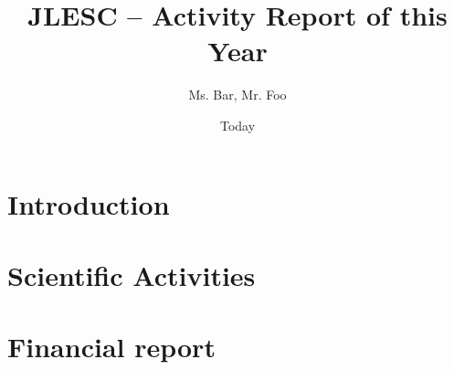 \documentclass[12pt]{article}
\title{JLESC -- Activity Report of this Year}
\author{Ms. Bar, Mr. Foo}
\date{Today}
\theoremstyle{definition}
\begin{document}
\maketitle
\thispagestyle{empty}
\vspace*{0.5cm}

\tableofcontents

\newpage
\section{Introduction}
\Blindtext

\section{Scientific Activities}








\newpage
\section{Financial report}
\blindtext
\end{document}
